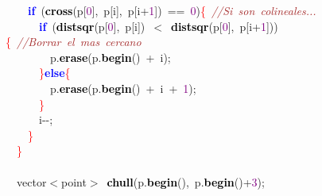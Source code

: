 \documentclass[10pt,a4paper,twoside]{article}
\begin{document}
{{{{{{{{{{\mbox{}\ \ \ \ \textbf{\textcolor{Blue}{if}}\ \textcolor{BrickRed}{(}\textbf{\textcolor{Black}{cross}}\textcolor{BrickRed}{(}p\textcolor{BrickRed}{[}\textcolor{Purple}{0}\textcolor{BrickRed}{],}\ p\textcolor{BrickRed}{[}i\textcolor{BrickRed}{],}\ p\textcolor{BrickRed}{[}i\textcolor{BrickRed}{+}\textcolor{Purple}{1}\textcolor{BrickRed}{])}\ \textcolor{BrickRed}{==}\ \textcolor{Purple}{0}\textcolor{BrickRed}{)}\textcolor{Red}{\{}\ \textit{\textcolor{Brown}{//Si\ son\ colineales...}} \\
\mbox{}\ \ \ \ \ \ \textbf{\textcolor{Blue}{if}}\ \textcolor{BrickRed}{(}\textbf{\textcolor{Black}{distsqr}}\textcolor{BrickRed}{(}p\textcolor{BrickRed}{[}\textcolor{Purple}{0}\textcolor{BrickRed}{],}\ p\textcolor{BrickRed}{[}i\textcolor{BrickRed}{])}\ \textcolor{BrickRed}{$<$}\ \textbf{\textcolor{Black}{distsqr}}\textcolor{BrickRed}{(}p\textcolor{BrickRed}{[}\textcolor{Purple}{0}\textcolor{BrickRed}{],}\ p\textcolor{BrickRed}{[}i\textcolor{BrickRed}{+}\textcolor{Purple}{1}\textcolor{BrickRed}{]))}\textcolor{Red}{\{}\ \textit{\textcolor{Brown}{//Borrar\ el\ mas\ cercano}} \\
\mbox{}\ \ \ \ \ \ \ \ p\textcolor{BrickRed}{.}\textbf{\textcolor{Black}{erase}}\textcolor{BrickRed}{(}p\textcolor{BrickRed}{.}\textbf{\textcolor{Black}{begin}}\textcolor{BrickRed}{()}\ \textcolor{BrickRed}{+}\ i\textcolor{BrickRed}{);} \\
\mbox{}\ \ \ \ \ \ \textcolor{Red}{\}}\textbf{\textcolor{Blue}{else}}\textcolor{Red}{\{} \\
\mbox{}\ \ \ \ \ \ \ \ p\textcolor{BrickRed}{.}\textbf{\textcolor{Black}{erase}}\textcolor{BrickRed}{(}p\textcolor{BrickRed}{.}\textbf{\textcolor{Black}{begin}}\textcolor{BrickRed}{()}\ \textcolor{BrickRed}{+}\ i\ \textcolor{BrickRed}{+}\ \textcolor{Purple}{1}\textcolor{BrickRed}{);} \\
\mbox{}\ \ \ \ \ \ \textcolor{Red}{\}} \\
\mbox{}\ \ \ \ \ \ i\textcolor{BrickRed}{-\/-;} \\
\mbox{}\ \ \ \ \textcolor{Red}{\}} \\
\mbox{}\ \ \textcolor{Red}{\}} \\
\mbox{}\ \  \\
\mbox{}\ \ vector\textcolor{BrickRed}{$<$}point\textcolor{BrickRed}{$>$}\ \textbf{\textcolor{Black}{chull}}\textcolor{BrickRed}{(}p\textcolor{BrickRed}{.}\textbf{\textcolor{Black}{begin}}\textcolor{BrickRed}{(),}\ p\textcolor{BrickRed}{.}\textbf{\textcolor{Black}{begin}}\textcolor{BrickRed}{()+}\textcolor{Purple}{3}\textcolor{BrickRed}{);} \\
}}}}}}}}}}
\end{document}
